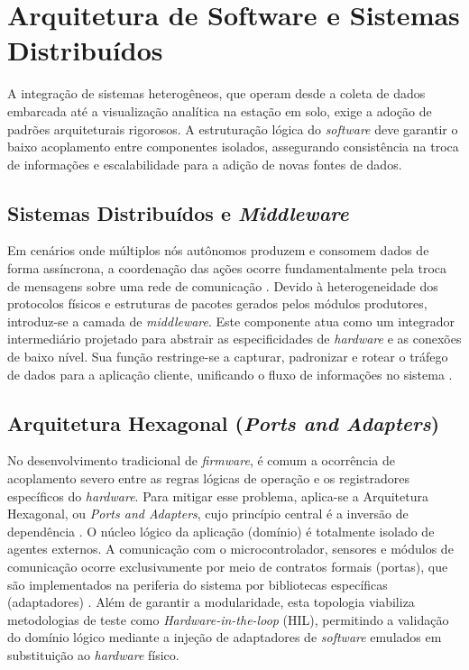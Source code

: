 \section{Arquitetura de Software e Sistemas Distribuídos}

A integração de sistemas heterogêneos, que operam desde a coleta de dados embarcada até a visualização analítica na estação em solo, exige a adoção de padrões arquiteturais rigorosos. A estruturação lógica do \textit{software} deve garantir o baixo acoplamento entre componentes isolados, assegurando consistência na troca de informações e escalabilidade para a adição de novas fontes de dados.

\subsection{Sistemas Distribuídos e \textit{Middleware}}

Em cenários onde múltiplos nós autônomos produzem e consomem dados de forma assíncrona, a coordenação das ações ocorre fundamentalmente pela troca de mensagens sobre uma rede de comunicação \cite{coulouris_distributed}. Devido à heterogeneidade dos protocolos físicos e estruturas de pacotes gerados pelos módulos produtores, introduz-se a camada de \textit{middleware}. Este componente atua como um integrador intermediário projetado para abstrair as especificidades de \textit{hardware} e as conexões de baixo nível. Sua função restringe-se a capturar, padronizar e rotear o tráfego de dados para a aplicação cliente, unificando o fluxo de informações no sistema \cite{coulouris_distributed}.

\subsection{Arquitetura Hexagonal (\textit{Ports and Adapters})}

No desenvolvimento tradicional de \textit{firmware}, é comum a ocorrência de acoplamento severo entre as regras lógicas de operação e os registradores específicos do \textit{hardware}. Para mitigar esse problema, aplica-se a Arquitetura Hexagonal, ou \textit{Ports and Adapters}, cujo princípio central é a inversão de dependência \cite{martin_clean_architecture}. O núcleo lógico da aplicação (domínio) é totalmente isolado de agentes externos. A comunicação com o microcontrolador, sensores e módulos de comunicação ocorre exclusivamente por meio de contratos formais (portas), que são implementados na periferia do sistema por bibliotecas específicas (adaptadores) \cite{martin_clean_architecture}. Além de garantir a modularidade, esta topologia viabiliza metodologias de teste como \textit{Hardware-in-the-loop} (HIL), permitindo a validação do domínio lógico mediante a injeção de adaptadores de \textit{software} emulados em substituição ao \textit{hardware} físico.

